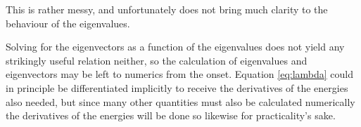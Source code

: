 \documentclass[a4paper]{article}
\begin{document}
This is rather messy, and unfortunately does not bring much clarity to the behaviour of the
eigenvalues. 

Solving for the eigenvectors as a function of the eigenvalues does not yield any strikingly
useful relation neither, so the calculation of eigenvalues and eigenvectors may be left to numerics from
the onset. Equation \ref{eq:lambda} could in principle be differentiated implicitly to
receive the derivatives of the energies also needed, but since many other quantities must
also be calculated numerically the derivatives of the energies will be done so likewise for
practicality's sake.
\end{document}
